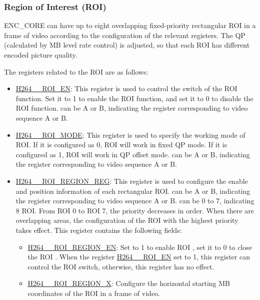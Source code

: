 \documentclass[main\_\_EN.tex]{subfiles}
\begin{document}
\subsubsection{Region of Interest (ROI)}\label{sec:h264-roi}
ENC\_CORE can have up to eight overlapping fixed-priority rectangular ROI in a frame of video according to the configuration of the relevant registers. The QP (calculated by MB level rate control) is adjusted, so that each ROI has different encoded picture quality.

The registers related to the ROI are as follows:
\begin{itemize}
    \item \hyperref[fielddesc:H264AROIEN]{H264\_\_ROI\_EN}: This register is used to control the switch of the ROI function. Set it to 1 to enable the ROI function, and set it to 0 to disable the ROI function.  can be A or B, indicating the register corresponding to video sequence A or B.
    \item \hyperref[fielddesc:H264AROIMODE]{H264\_\_ROI\_MODE}: This register is used to specify the working mode of ROI. If it is configured as 0, ROI will work in fixed QP mode. If it is configured as 1, ROI will work in QP offset mode.  can be A or B, indicating the register corresponding to video sequence A or B.
    \item \hyperref[regdesc:H264AROIREGION0REG]{H264\_\_ROI\_REGION\_REG}: This register is used to configure the enable and position information of each rectangular ROI.  can be A or B, indicating the register corresponding to video sequence A or B.  can be 0 to 7, indicating 8 ROI. From ROI 0 to ROI 7, the priority decreases in order. When there are overlapping areas, the configuration of the ROI with the highest priority takes effect. This register contains the following fields:
        \begin{itemize}
            \item \hyperref[fielddesc:H264AROIREGION0EN]{H264\_\_ROI\_REGION\_EN}: Set to 1 to enable ROI , set it to 0 to close the ROI . When the register \hyperref[fielddesc:H264AROIEN]{H264\_\_ROI\_EN} set to 1, this register can control the ROI  switch, otherwise, this register has no effect.
            \item \hyperref[fielddesc:H264AROIREGION0X]{H264\_\_ROI\_REGION\_X}: Configure the horizontal starting MB coordinates of the ROI  in a frame of video.

\end{itemize}
\end{itemize}
\end{document}
